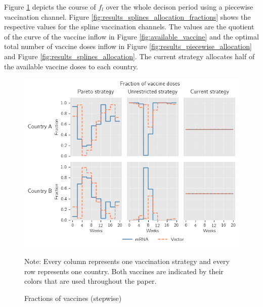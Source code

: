 Figure \ref{fig:results_piecewise_allocation_fractions} depicts the course of $f_l$ over the whole decison period using a piecewise vaccination channel. Figure \ref{fig:results_splines_allocation_fractions} shows the respective values for the spline vaccination channels. The values are the quotient of the curve of the vaccine inflow in Figure \ref{fig:available_vaccine} and the optimal total number of vaccine doses inflow in Figure \ref{fig:results_piecewise_allocation} and Figure \ref{fig:results_splines_allocation}. The current strategy allocates half of the available vaccine doses to each country.
\begin{figure}[h!]
\centering
\includegraphics[scale=0.75]{images/piecewise_vaccine_fractions.png}\\
\begin{flushleft}
\scriptsize{Note:} Every column represents one vaccination strategy and every row represents one country. Both vaccines are indicated by their colors that are used throughout the paper. 
\end{flushleft}
\caption{Fractions of vaccines (stepwise)}
\label{fig:results_piecewise_allocation_fractions}
\end{figure}


